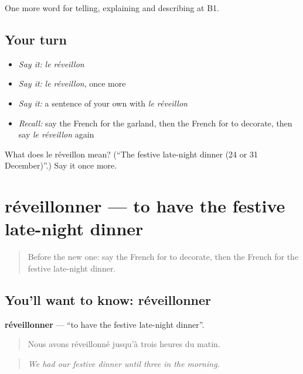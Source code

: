 \begin{grammarlens}[title={What you've built}]
One more word for telling, explaining and describing at B1.
\end{grammarlens}

\subsection*{Your turn}
\begin{itemize}
\raggedright
  \item \emph{Say it:} \emph{le réveillon}
  \item \emph{Say it:} \emph{le réveillon}, once more
  \item \emph{Say it:} a sentence of your own with \emph{le réveillon}
  \item \emph{Recall:} say the French for the garland, then the French for to decorate, then say \emph{le réveillon} again
\end{itemize}

\begin{tcolorbox}[breakable,colback=teal!4,colframe=teal!35!black,title={Before you move on}]
What does le réveillon mean? (\textquotedblleft{}The festive late-night dinner (24 or 31 December)\textquotedblright{}.) Say it once more.
\end{tcolorbox}
\section[réveillonner]{réveillonner — to have the festive late-night dinner}

\label{lesson:FR-C319-reveillonner}



\begin{quote}
Before the new one: say the French for to decorate, then the French for the festive late-night dinner.
\end{quote}

\subsection*{You'll want to know: réveillonner}
\textbf{réveillonner} — \textquotedblleft{}to have the festive late-night dinner\textquotedblright{}.

\begin{quote}
Nous avons réveillonné jusqu'à trois heures du matin.
\end{quote}

\begin{quote}
\emph{We had our festive dinner until three in the morning.}
\end{quote}

